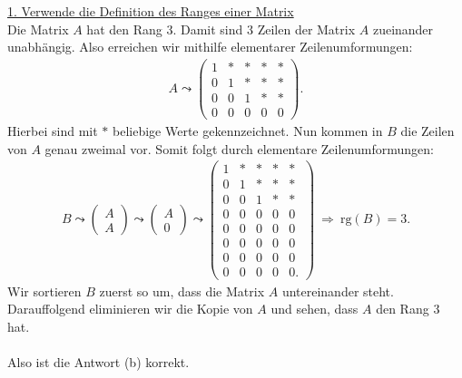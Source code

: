 \underline{1. Verwende die Definition des Ranges einer Matrix}\\
Die Matrix $ A $ hat den Rang $ 3 $.
Damit sind $ 3  $ Zeilen der Matrix $ A $ zueinander unabhängig.
Also erreichen wir mithilfe elementarer Zeilenumformungen:
\begin{align*}
	A
	\leadsto
	\begin{pmatrix}
		1 & \ast & \ast & \ast &\ast \\
		0 & 1 &  \ast & \ast &\ast\\
		0 & 0 & 1 & \ast &\ast\\
		0 & 0 & 0 & 0 &0
	\end{pmatrix}.
\end{align*}
Hierbei sind mit $ \ast $ beliebige Werte gekennzeichnet.
Nun kommen in $ B $ die Zeilen von $ A $ genau zweimal vor.
Somit folgt durch elementare Zeilenumformungen:
\begin{align*}
	B 
	\leadsto
	\begin{pmatrix}
		A\\
		A
	\end{pmatrix}
	\leadsto
	\begin{pmatrix}
		A\\
		0
	\end{pmatrix}
	\leadsto
	\begin{pmatrix}
		1 & \ast & \ast & \ast &\ast \\
		0 & 1 &  \ast & \ast &\ast\\
		0 & 0 & 1 & \ast &\ast\\
		0 & 0 & 0 & 0 &0\\
		0 & 0 & 0 & 0 &0\\
		0 & 0 & 0 & 0 &0\\
		0 & 0 & 0 & 0 &0\\
		0 & 0 & 0 & 0 &0.
	\end{pmatrix}
	\ \Rightarrow \
	\mathrm{rg}(B) = 3.
\end{align*}
Wir sortieren $ B $ zuerst so um, dass die Matrix $  A $ untereinander steht.
Darauffolgend eliminieren wir die Kopie von $ A $ und sehen, dass $ A $ den Rang $ 3 $ hat.\\
\\
Also ist die Antwort (b) korrekt.   


\newpage

